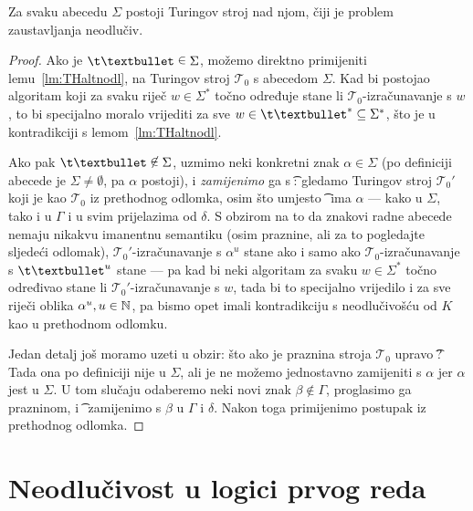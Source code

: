 \begin{propozicija}
Za svaku abecedu $\Sigma$ postoji Turingov stroj nad njom, čiji je problem zaustavljanja neodlučiv.
\end{propozicija}
\begin{proof}
Ako je $\t\textbullet\;\raisebox{1.1pt}{$\in$}\;\Sigma$, možemo direktno primijeniti lemu~\ref{lm:THaltnodl}, na Turingov stroj $\mathcal T_0$ s abecedom $\Sigma$. Kad bi postojao algoritam koji za svaku riječ $w\in\Sigma^*$ točno određuje stane li $\mathcal T_0$-izračunavanje s $w$, to bi specijalno moralo vrijediti za sve $w\in\t\textbullet^*\subseteq\Sigma^*$, što je u kontradikciji s lemom~\ref{lm:THaltnodl}.

Ako pak $\t\textbullet\;\raisebox{1.1pt}{$\not\in$}\;\Sigma$, uzmimo neki konkretni znak $\alpha\in\Sigma$ (po definiciji abecede je $\Sigma\not=\emptyset$, pa $\alpha$ postoji), i \emph{zamijenimo} ga s \t\textbullet: gledamo Turingov stroj $\mathcal T_0'$ koji je kao $\mathcal T_0$ iz prethodnog odlomka, osim što umjesto \t\textbullet\ ima $\alpha$ --- kako u $\Sigma$, tako i u $\Gamma$ i u svim prijelazima od $\delta$. S obzirom na to da znakovi radne abecede nemaju nikakvu imanentnu semantiku (osim praznine, ali za to pogledajte sljedeći odlomak), $\mathcal T_0'$-izračunavanje s $\alpha^u$ stane ako i samo ako $\mathcal T_0$-izračunavanje s $\t\textbullet^u$ stane --- pa kad bi neki algoritam za svaku $w\in\Sigma^*$ točno određivao stane li $\mathcal T_0'$-izračunavanje s $w$, tada bi to specijalno vrijedilo i za sve riječi oblika $\alpha^u,u\in{\mathbb N}$, pa bismo opet imali kontradikciju s neodlučivošću od $K$ kao u prethodnom odlomku.

Jedan detalj još moramo uzeti u obzir: što ako je praznina stroja $\mathcal T_0$ upravo \t\textbullet? Tada ona po definiciji nije u $\Sigma$, ali je ne možemo jednostavno zamijeniti s $\alpha$ jer $\alpha$ jest u $\Sigma$. U tom slučaju odaberemo neki novi znak $\beta\not\in\Gamma$, proglasimo ga prazninom, i \t\textbullet\ zamijenimo s $\beta$ u $\Gamma$ i $\delta$. Nakon toga primijenimo postupak iz prethodnog odlomka.
\end{proof}

\section{Neodlučivost u logici prvog reda}

